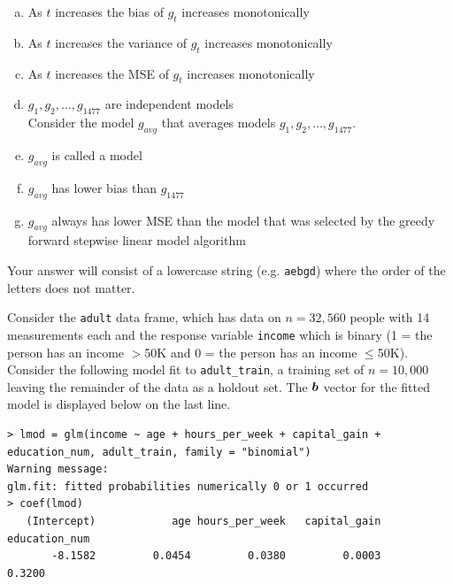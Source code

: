 \documentclass[12pt,landscape]{article}
\newcommand{\instr}{\small Your answer will consist of a lowercase string (e.g. \texttt{aebgd}) where the order of the letters does not matter. \normalsize}
\begin{document}
\begin{enumerate}[(a)]
\item As $t$ increases the bias of $g_t$ increases monotonically
\item As $t$ increases the variance of $g_t$ increases monotonically
\item As $t$ increases the MSE of $g_t$ increases monotonically 
\item $g_1, g_2, \ldots, g_{1477}$ are independent models\\

Consider the model $g_{avg}$ that averages models $g_1, g_2, \ldots, g_{1477}$.

\item $g_{avg}$ is called a  model
\item $g_{avg}$ has lower bias than $g_{1477}$
\item $g_{avg}$ always has lower MSE than the model that was selected by the greedy forward stepwise linear model algorithm
\end{enumerate}
\eenum\instr\pagebreak


\problem{} Consider the \texttt{adult} data frame, which has data on $n = 32,560$ people with 14 measurements each and the response variable \texttt{income} which is binary (1 = the person has an income $>$50K and 0 = the person has an income  $\leq$50K). Consider the following model fit to \texttt{adult\_train}, a training set of $n=10,000$ leaving the remainder of the data as a holdout set. The $\boldsymbol{b}$ vector for the fitted model is displayed below on the last line.

\lstset{
  basicstyle=\footnotesize,
  xleftmargin=.0\textwidth, xrightmargin=.0\textwidth
}
\begin{lstlisting}
> lmod = glm(income ~ age + hours_per_week + capital_gain + education_num, adult_train, family = "binomial")
Warning message:
glm.fit: fitted probabilities numerically 0 or 1 occurred 
> coef(lmod)
   (Intercept)            age hours_per_week   capital_gain  education_num 
       -8.1582         0.0454         0.0380         0.0003         0.3200
\end{lstlisting}

\vspace{-0.8cm}\benum{}
\end{document}
